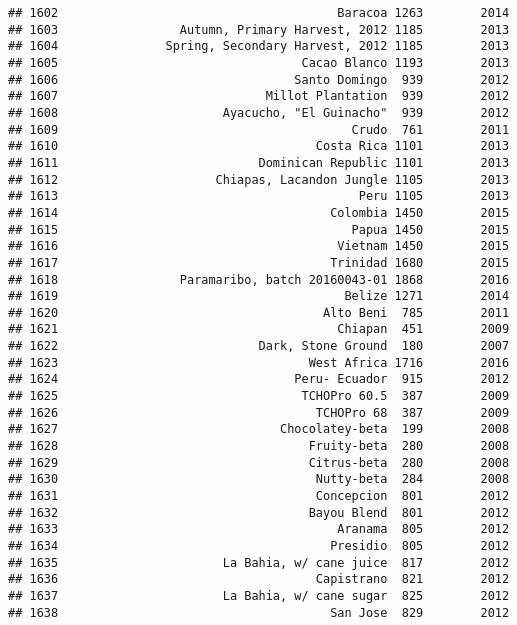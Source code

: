 \documentclass[
]{article}
\begin{document}
\begin{verbatim}
## 1602                                       Baracoa 1263        2014
## 1603                 Autumn, Primary Harvest, 2012 1185        2013
## 1604               Spring, Secondary Harvest, 2012 1185        2013
## 1605                                  Cacao Blanco 1193        2013
## 1606                                 Santo Domingo  939        2012
## 1607                             Millot Plantation  939        2012
## 1608                       Ayacucho, "El Guinacho"  939        2012
## 1609                                         Crudo  761        2011
## 1610                                    Costa Rica 1101        2013
## 1611                            Dominican Republic 1101        2013
## 1612                      Chiapas, Lacandon Jungle 1105        2013
## 1613                                          Peru 1105        2013
## 1614                                      Colombia 1450        2015
## 1615                                         Papua 1450        2015
## 1616                                       Vietnam 1450        2015
## 1617                                      Trinidad 1680        2015
## 1618                 Paramaribo, batch 20160043-01 1868        2016
## 1619                                        Belize 1271        2014
## 1620                                     Alto Beni  785        2011
## 1621                                       Chiapan  451        2009
## 1622                            Dark, Stone Ground  180        2007
## 1623                                   West Africa 1716        2016
## 1624                                 Peru- Ecuador  915        2012
## 1625                                  TCHOPro 60.5  387        2009
## 1626                                    TCHOPro 68  387        2009
## 1627                               Chocolatey-beta  199        2008
## 1628                                   Fruity-beta  280        2008
## 1629                                   Citrus-beta  280        2008
## 1630                                    Nutty-beta  284        2008
## 1631                                    Concepcion  801        2012
## 1632                                   Bayou Blend  801        2012
## 1633                                       Aranama  805        2012
## 1634                                      Presidio  805        2012
## 1635                       La Bahia, w/ cane juice  817        2012
## 1636                                    Capistrano  821        2012
## 1637                       La Bahia, w/ cane sugar  825        2012
## 1638                                      San Jose  829        2012

\end{verbatim}
\end{document}
